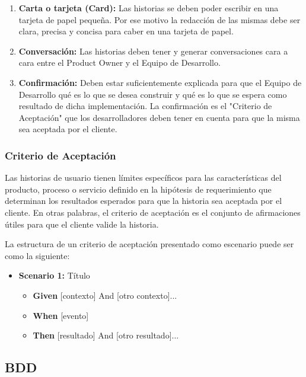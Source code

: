 \begin{enumerate}

\item \textbf{Carta o tarjeta (Card):} Las historias se deben poder escribir en una tarjeta de papel pequeña. Por ese motivo la redacción de las mismas debe ser clara, precisa y concisa para caber en una tarjeta de papel.

\item \textbf{Conversación:} Las historias deben tener y generar conversaciones cara a cara entre el Product Owner y el Equipo de Desarrollo.

\item \textbf{Confirmación:} Deben estar suficientemente explicada para que el Equipo de Desarrollo qué es lo que se desea construir y qué es lo que se espera como resultado de dicha implementación. La confirmación es el "Criterio de Aceptación" que los desarrolladores deben tener en cuenta para que la misma sea aceptada por el cliente.

\end{enumerate}

\subsubsection{Criterio de Aceptación}

Las historias de usuario tienen límites específicos para las características del producto, proceso o servicio definido en la hipótesis de requerimiento que determinan los resultados esperados para que la historia sea aceptada por el cliente. En otras palabras, el criterio de aceptación es el conjunto de afirmaciones útiles para que el cliente valide la historia.

La estructura de un criterio de aceptación presentado como escenario puede ser como la siguiente:

\begin{itemize}
\item \textbf{Scenario 1:} Título
  \begin{itemize}
  \item \textbf{Given} [contexto] And [otro contexto]...
  \item \textbf{When}  [evento] 
  \item \textbf{Then}  [resultado] And [otro resultado]...
  \end{itemize}
\end{itemize}

\subsection{BDD}

